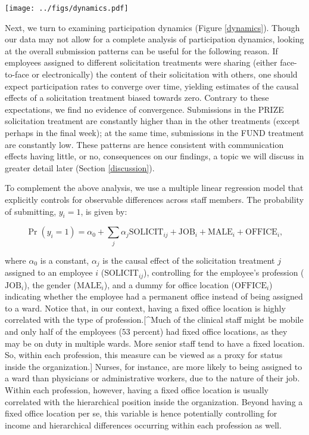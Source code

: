 \documentclass[12pt, titlepage]{article}
\begin{document}
\texttt{[image: ../figs/dynamics.pdf]}

Next, we turn to examining participation dynamics (Figure
\ref{dynamics}). Though our data may not allow for a complete analysis
of participation dynamics, looking at the overall submission patterns
can be useful for the following reason. If employees assigned to
different solicitation treatments were sharing (either face-to-face or
electronically) the content of their solicitation with others, one
should expect participation rates to converge over time, yielding
estimates of the causal effects of a solicitation treatment biased
towards zero. Contrary to these expectations, we find no evidence of
convergence. Submissions in the PRIZE solicitation treatment are
constantly higher than in the other treatments (except perhaps in the
final week); at the same time, submissions in the FUND treatment are
constantly low. These patterns are hence consistent with communication
effects having little, or no, consequences on our findings, a topic we
will discuss in greater detail later (Section \ref{discussion}).

To complement the above analysis, we use a multiple linear regression
model that explicitly controls for observable differences across staff
members. The probability of submitting, \(y_i=1\), is given by:

\[\Pr(y_i=1) = \alpha_0 
                                    + \sum_{j} \alpha_{j} \text{SOLICIT}_{ij}
                                    + \text{JOB}_{i} 
                                    + \text{MALE}_{i} 
                                    + \text{OFFICE}_{i},\label{submit}\]

where \(\alpha_0\) is a constant, \(\alpha_j\) is the causal effect of
the solicitation treatment \(j\) assigned to an employee \(i\)
(\(\text{SOLICIT}_{ij}\)), controlling for the employee's profession
(\(\text{JOB}_i\)), the gender (\(\text{MALE}_i\)), and a dummy for
office location (\(\text{OFFICE}_i\)) indicating whether the employee
had a permanent office instead of being assigned to a ward. Notice that,
in our context, having a fixed office location is highly correlated with
the type of profession.{[}\^{}Much of the clinical staff might be mobile
and only half of the employees (\(53\) percent) had fixed office
locations, as they may be on duty in multiple wards. More senior staff
tend to have a fixed location. So, within each profession, this measure
can be viewed as a proxy for status inside the organization.{]} Nurses,
for instance, are more likely to being assigned to a ward than
physicians or administrative workers, due to the nature of their job.
Within each profession, however, having a fixed office location is
usually correlated with the hierarchical position inside the
organization. Beyond having a fixed office location per se, this
variable is hence potentially controlling for income and hierarchical
differences occurring within each profession as well.
\end{document}
